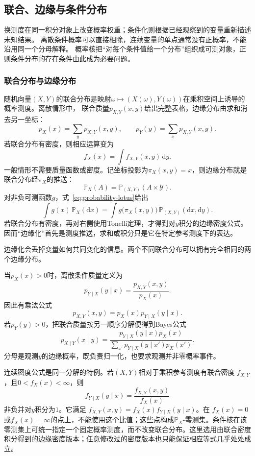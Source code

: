 \subsection{联合、边缘与条件分布}
\label{sec:probability-joint-marginal-conditional}

换测度在同一积分对象上改变概率权重；条件化则根据已经观察到的变量重新描述未知结果。
离散条件概率可以直接相除，连续变量的单点通常没有正概率，不能沿用同一个分母解释。
概率核把“对每个条件值给一个分布”组织成可测对象，正则条件分布的存在条件由此成为必要问题。

\subsubsection{联合分布与边缘分布}

随机向量\((X,Y)\)的联合分布是映射\(\omega\mapsto(X(\omega),Y(\omega))\)在乘积空间上诱导的概率测度。离散情形中，
联合质量\(p_{X,Y}(x,y)\)给出完整表格，边缘分布由求和消去另一坐标：
\[ p_X(x)=\sum_y p_{X,Y}(x,y),
  \qquad p_Y(y)=\sum_x p_{X,Y}(x,y). \]
若联合分布有密度，则相应运算变为
\[ f_X(x)=\int f_{X,Y}(x,y)\,\mathrm{d}y. \]
一般情形不需要质量函数或密度。记坐标投影为\(\pi_X(x,y)=x\)，则边缘分布就是联合分布经\(\pi_X\)的推送：
\[
  \mathbb{P}_X(A)
  =\mathbb{P}_{(X,Y)}(A\times\mathcal{Y}).
\]
对非负可测函数\(g\)，式~\eqref{eq:probability-lotus}给出
\[
  \int g(x)\,\mathbb{P}_X(\mathrm{d}x)
  =
  \int g\bigl(\pi_X(x,y)\bigr)\,
       \mathbb{P}_{(X,Y)}(\mathrm{d}x,\mathrm{d}y).
\]
若联合分布有密度，再对右侧使用Tonelli定理，才得到对\(y\)积分的边缘密度公式。因而“边缘化”首先是测度推送，求和或积分只是它在特定参考测度下的表达。

边缘化会丢掉变量如何共同变化的信息。两个不同联合分布可以拥有完全相同的两个边缘分布。

当\(p_X(x)>0\)时，离散条件质量定义为
\[ p_{Y\mid X}(y\mid x)
  =\frac{p_{X,Y}(x,y)}{p_X(x)}. \]
因此有乘法公式
\[ p_{X,Y}(x,y)=p_X(x)p_{Y\mid X}(y\mid x). \]
若\(p_Y(y)>0\)，把联合质量按另一顺序分解便得到Bayes公式
\begin{equation}
  p_{X\mid Y}(x\mid y)
  =
  \frac{p_{Y\mid X}(y\mid x)p_X(x)}
       {\sum_{x'}p_{Y\mid X}(y\mid x')p_X(x')}.
  \label{eq:probability-discrete-bayes}
\end{equation}
分母是观测\(y\)的边缘概率，既负责归一化，也要求观测并非零概率事件。

连续密度公式是同一分解的特例。若\((X,Y)\)相对于乘积参考测度有联合密度
\(f_{X,Y}\)，且\(0<f_X(x)<\infty\)，则
\[
  f_{Y\mid X}(y\mid x)
  =\frac{f_{X,Y}(x,y)}{f_X(x)}
\]
非负并对\(y\)积分为\(1\)。它满足
\(f_{X,Y}(x,y)=f_X(x)f_{Y\mid X}(y\mid x)\)。在
\(f_X(x)=0\)或\(f_X(x)=\infty\)的点上，不能使用这个比值；这些点构成\(\mathbb P_X\)-零测集。条件核在该零测集上可统一指定一个固定概率测度，而不改变联合分布。这里选用由联合密度积分得到的边缘密度版本；任意修改过的密度版本也只能保证相应等式几乎处处成立。

